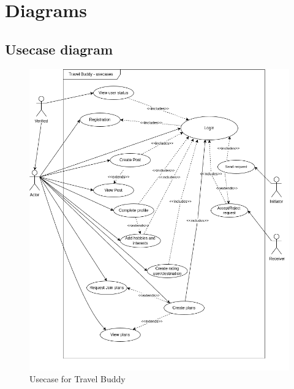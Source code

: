 \documentclass[12pt,a4paper]{report}
\begin{document}
\chapter{Diagrams}

\section{Usecase diagram}
\begin{figure}[H]
    \centering
    \includegraphics[scale=1.1]{figures/usecase.png}
    \caption{Usecase for Travel Buddy}
    \label{fig:usecase}
\end{figure}
\pagebreak
\end{document}
